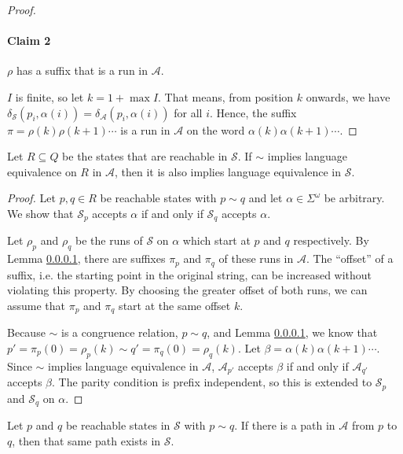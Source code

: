 \begin{proof}
	\paragraph{Claim 2} $\rho$ has a suffix that is a run in $\mathcal{A}$.
	
	$I$ is finite, so let $k = 1 + \max I$. That means, from position $k$ onwards, we have $\delta_\mathcal{S}(p_i, \alpha(i)) = \delta_\mathcal{A}(p_i, \alpha(i))$ for all $i$. Hence, the suffix $\pi = \rho(k) \rho(k+1) \cdots$ is a run in $\mathcal{A}$ on the word $\alpha(k) \alpha(k+1) \cdots$.
\end{proof}


\begin{lem}
	Let $R \subseteq Q$ be the states that are reachable in $\mathcal{S}$. If $\sim$ implies language equivalence on $R$ in $\mathcal{A}$, then it is also implies language equivalence in $\mathcal{S}$.
\end{lem}

\begin{proof}
	Let $p, q \in R$ be reachable states with $p \sim q$ and let $\alpha \in \Sigma^\omega$ be arbitrary. We show that $\mathcal{S}_p$ accepts $\alpha$ if and only if $\mathcal{S}_q$ accepts $\alpha$.
	
	Let $\rho_p$ and $\rho_q$ be the runs of $\mathcal{S}$ on $\alpha$ which start at $p$ and $q$ respectively. By Lemma \ref{}, there are suffixes $\pi_p$ and $\pi_q$ of these runs in $\mathcal{A}$. The \enquote{offset} of a suffix, i.e. the starting point in the original string, can be increased without violating this property. By choosing the greater offset of both runs, we can assume that $\pi_p$ and $\pi_q$ start at the same offset $k$.
	
	Because $\sim$ is a congruence relation, $p \sim q$, and Lemma \ref{}, we know that $p' = \pi_p(0) = \rho_p(k) \sim q' = \pi_q(0) = \rho_q(k)$. Let $\beta = \alpha(k) \alpha(k+1) \cdots$. Since $\sim$ implies language equivalence in $\mathcal{A}$, $\mathcal{A}_{p'}$ accepts $\beta$ if and only if $\mathcal{A}_{q'}$ accepts $\beta$. The parity condition is prefix independent, so this is extended to $\mathcal{S}_p$ and $\mathcal{S}_q$ on $\alpha$.
\end{proof}


\begin{lem}
	Let $p$ and $q$ be reachable states in $\mathcal{S}$ with $p \sim q$. If there is a path in $\mathcal{A}$ from $p$ to $q$, then that same path exists in $\mathcal{S}$.
\end{lem}

